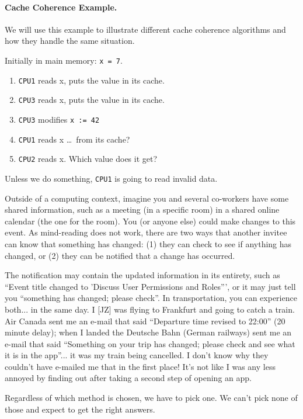\paragraph{Cache Coherence Example.} We will use this example to illustrate
different cache coherence algorithms and how they handle the same situation.

Initially in main memory: {\tt x = 7}.

  \begin{enumerate}
    \item {\tt CPU1} reads x, puts the value in its cache.
    \item {\tt CPU3} reads x, puts the value in its cache.
    \item {\tt CPU3} modifies {\tt x := 42}
    \item {\tt CPU1} reads x \ldots ~from its cache?
    \item {\tt CPU2} reads x. Which value does it get?
  \end{enumerate}

Unless we do something, {\tt CPU1} is going to read invalid data.
  
Outside of a computing context, imagine you and several co-workers have some shared information, such as a meeting (in a specific room) in a shared online calendar (the one for the room). You (or anyone else) could make changes to this event. As mind-reading does not work, there are two ways that another invitee can know that something has changed: (1) they can check to see if anything has changed, or (2) they can be notified that a change has occurred. 

The notification may contain the updated information in its entirety, such as ``Event title changed to 'Discuss User Permissions and Roles''', or it may just tell you ``something has changed; please check''. In transportation, you can experience both... in the same day. I [JZ] was flying to Frankfurt and going to catch a train. Air Canada sent me an e-mail that said ``Departure time revised to 22:00'' (20 minute delay); when I landed the Deutsche Bahn (German railways) sent me an e-mail that said ``Something on your trip has changed; please check and see what it is in the app''... it was my train being cancelled. I don't know why they couldn't have e-mailed me that in the first place! It's not like I was any less annoyed by finding out after taking a second step of opening an app.

Regardless of which method is chosen, we have to pick one. We can't pick none of those and expect to get the right answers.


